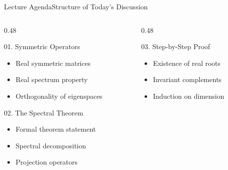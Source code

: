 \documentclass[10pt, aspectratio=169]{beamer}
\begin{document}
\begin{frame}{Lecture Agenda}{Structure of Today's Discussion}
  \begin{columns}[T]
    \begin{column}{0.48\textwidth}
      \begin{conceptbox}{01. Symmetric Operators}
        \small
        \begin{itemize}
          \setlength{\itemsep}{1pt}
          \item Real symmetric matrices
          \item Real spectrum property
          \item Orthogonality of eigenspaces
        \end{itemize}
      \end{conceptbox}
      
      \vspace*{0.15cm}
      
      \begin{conceptbox}{02. The Spectral Theorem}
        \small
        \begin{itemize}
          \setlength{\itemsep}{1pt}
          \item Formal theorem statement
          \item Spectral decomposition
          \item Projection operators
        \end{itemize}
      \end{conceptbox}
    \end{column}

    \begin{column}{0.48\textwidth}
      \begin{conceptbox}{03. Step-by-Step Proof}
        \small
        \begin{itemize}
          \setlength{\itemsep}{1pt}
          \item Existence of real roots
          \item Invariant complements
          \item Induction on dimension
        \end{itemize}
      \end{conceptbox}
      
      \vspace*{0.15cm}
      

\end{column}
\end{columns}
\end{frame}
\end{document}
